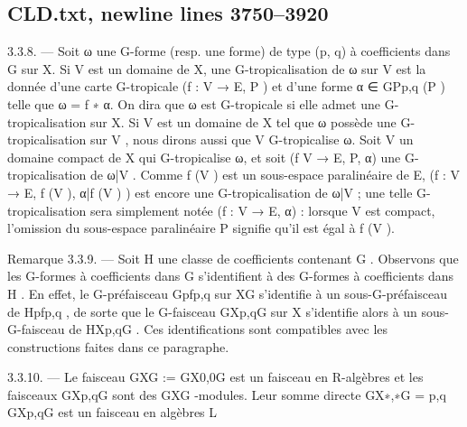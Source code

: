 \documentclass[
  10pt,
]{article}
\newenvironment{Shaded}{}{}
\newcommand{\NormalTok}[1]{#1}
\begin{document}
\subsection{CLD.txt, newline lines
3750--3920}\label{cld.txt-newline-lines-37503920}

\begin{Shaded}
\begin{Highlighting}[]
\NormalTok{3.3.8. — Soit ω une G{-}forme (resp. une forme) de type (p, q) à coefficients dans G}
\NormalTok{sur X. Si V est un domaine de X, une G{-}tropicalisation de ω sur V est la donnée d’une}
\NormalTok{carte G{-}tropicale (f : V → E, P ) et d’une forme α ∈ GPp,q (P ) telle que ω = f ∗ α.}
\NormalTok{  On dira que ω est G{-}tropicale si elle admet une G{-}tropicalisation sur X.}
\NormalTok{  Si V est un domaine de X tel que ω possède une G{-}tropicalisation sur V , nous dirons}
\NormalTok{aussi que V G{-}tropicalise ω.}
\NormalTok{  Soit V un domaine compact de X qui G{-}tropicalise ω, et soit (f V → E, P, α) une}
\NormalTok{G{-}tropicalisation de ω|V . Comme f (V ) est un sous{-}espace paralinéaire de E, (f : V →}
\NormalTok{E, f (V ), α|f (V ) ) est encore une G{-}tropicalisation de ω|V ; une telle G{-}tropicalisation sera}
\NormalTok{simplement notée (f : V → E, α) : lorsque V est compact, l’omission du sous{-}espace}
\NormalTok{paralinéaire P signifie qu’il est égal à f (V ).}

\NormalTok{Remarque 3.3.9. — Soit H une classe de coefficients contenant G . Observons que}
\NormalTok{les G{-}formes à coefficients dans G s’identifient à des G{-}formes à coefficients dans H .}
\NormalTok{   En effet, le G{-}préfaisceau Gpfp,q sur XG s’identifie à un sous{-}G{-}préfaisceau de Hpfp,q , de}
\NormalTok{sorte que le G{-}faisceau GXp,qG sur X s’identifie alors à un sous{-}G{-}faisceau de HXp,qG}
\NormalTok{                                                                                       . Ces}
\NormalTok{identifications sont compatibles avec les constructions faites dans ce paragraphe.}

\NormalTok{3.3.10. — Le faisceau GXG := GX0,0G est un faisceau en R{-}algèbres et les faisceaux GXp,qG}
\NormalTok{sont des GXG {-}modules. Leur somme directe GX∗,∗G = p,q GXp,qG est un faisceau en algèbres}
\NormalTok{                                                   L}


\end{Highlighting}
\end{Shaded}
\end{document}
